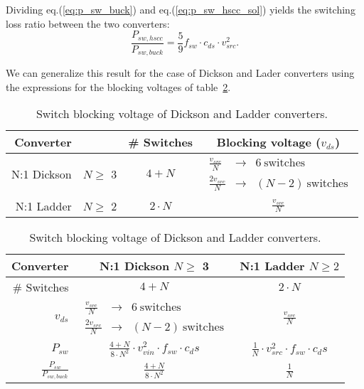 Dividing eq.(\ref{eq:p_sw_buck}) and eq.(\ref{eq:p_sw_hscc_sol}) yields the switching loss ratio between the two converters:
\begin{equation}
\frac{P_{sw,hscc}}{P_{sw,buck}} =  \frac{5}{9}  f_{sw} \cdot c_{ds} \cdot v_{src}^2.
\label{eq:p_sw_hscc_sol}
\end{equation}

We can generalize this result for the case of Dickson and Lader converters using the expressions for the blocking voltages of table~\ref{tab:Dick_Ladder_v_blk}.


\begin{table}[h]
\centering
\caption{Switch blocking voltage of Dickson and Ladder converters.}
\label{tab:Dick_Ladder_v_blk}
\renewcommand{\arraystretch}{1.5}%
\begin{tabular}{r c | c  c }
 Converter &  & \# Switches & Blocking voltage ($v_{ds}$)    \\
 \midrule
 N:1 Dickson & $ N \geq$ 3 & $4+N$ & $\begin{array} {rcl} \frac{v_{src}}{N} & \to & 6~ \text{switches} \\ 
                                                      \frac{2 v_{src}}{N} & \to & (N - 2) ~\text{switches}  
                                      \end{array}$ \\  
 N:1 Ladder & $ N \geq$ 2 & $2\cdot N$ & $ \frac{v_{src}}{N} $ \\
 
 
\end{tabular}
\end{table}


\begin{table}[h]
\centering
\caption{Switch blocking voltage of Dickson and Ladder converters.}
\label{tab:Dick_Ladder_v_blk}
\renewcommand{\arraystretch}{1.5}%
\begin{tabular}{r | c  c   }
 Converter &  N:1 Dickson  $ N \geq$ 3  &  N:1 Ladder $ N \geq 2$  \\  
 \midrule
\# Switches & $ 4 + N $  & $2 \cdot N$ \\ 
 $v_{ds}$ & $\begin{array} {rcl} \frac{v_{src}}{N}   & \to &  6~ \text{switches} \\
                                           \frac{2 v_{src}}{N} & \to &  (N - 2) ~\text{switches}
                       \end{array}$  
                       &   $ \frac{v_{src}}{N} $ \\
 $ P_{sw}$ &  $ \frac{4+N}{8 \cdot N^2} \cdot v_{vin}^2 \cdot f_{sw}  \cdot {c_ds} $ &  $ \frac{1}{ N} \cdot v_{src}^2 \cdot f_{sw} \cdot {c_ds} $  \\
 $ \frac{P_{sw}}{P_{sw,buck}}$ &  $ \frac{4+N}{8 \cdot N^2}  $ &  $ \frac{1}{ N}  $  \\
 
 
 \end{tabular}
\end{table}



